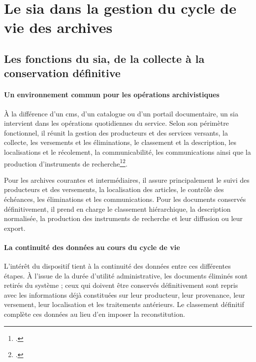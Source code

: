 \section{Le \gls{sia} dans la gestion du cycle de vie des archives}
\label{sec:sia-changement-echelle}

\subsection{Les fonctions du \gls{sia}, de la collecte à la conservation définitive}

\paragraph{Un environnement commun pour les opérations archivistiques}

À la différence d'un \gls{cms}, d'un catalogue ou d'un portail documentaire, un \gls{sia} intervient dans les opérations quotidiennes du service. Selon son périmètre fonctionnel, il réunit la gestion des producteurs et des services versants, la collecte, les versements et les éliminations, le classement et la description, les localisations et le récolement, la communicabilité, les communications ainsi que la production d'instruments de recherche\footcite{Hamard2020}\footcite{MoalicMinnaert2023}.

Pour les archives courantes et intermédiaires, il assure principalement le suivi des producteurs et des versements, la localisation des articles, le contrôle des échéances, les éliminations et les communications. Pour les documents conservés définitivement, il prend en charge le classement hiérarchique, la description normalisée, la production des instruments de recherche et leur diffusion ou leur export.

\paragraph{La continuité des données au cours du cycle de vie}

L'intérêt du dispositif tient à la continuité des données entre ces différentes étapes. À l'issue de la durée d'utilité administrative, les documents éliminés sont retirés du système ; ceux qui doivent être conservés définitivement sont repris avec les informations déjà constituées sur leur producteur, leur provenance, leur versement, leur localisation et les traitements antérieurs. Le classement définitif complète ces données au lieu d'en imposer la reconstitution.

